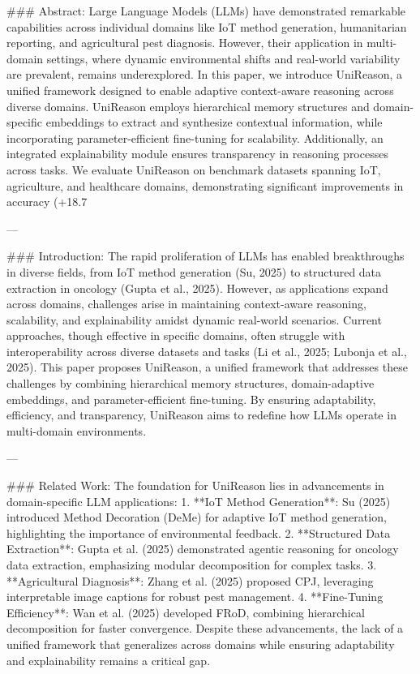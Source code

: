 ### Abstract:
Large Language Models (LLMs) have demonstrated remarkable capabilities across individual domains like IoT method generation, humanitarian reporting, and agricultural pest diagnosis. However, their application in multi-domain settings, where dynamic environmental shifts and real-world variability are prevalent, remains underexplored. In this paper, we introduce UniReason, a unified framework designed to enable adaptive context-aware reasoning across diverse domains. UniReason employs hierarchical memory structures and domain-specific embeddings to extract and synthesize contextual information, while incorporating parameter-efficient fine-tuning for scalability. Additionally, an integrated explainability module ensures transparency in reasoning processes across tasks. We evaluate UniReason on benchmark datasets spanning IoT, agriculture, and healthcare domains, demonstrating significant improvements in accuracy (+18.7%

---

### Introduction:
The rapid proliferation of LLMs has enabled breakthroughs in diverse fields, from IoT method generation (Su, 2025) to structured data extraction in oncology (Gupta et al., 2025). However, as applications expand across domains, challenges arise in maintaining context-aware reasoning, scalability, and explainability amidst dynamic real-world scenarios. Current approaches, though effective in specific domains, often struggle with interoperability across diverse datasets and tasks (Li et al., 2025; Lubonja et al., 2025). This paper proposes UniReason, a unified framework that addresses these challenges by combining hierarchical memory structures, domain-adaptive embeddings, and parameter-efficient fine-tuning. By ensuring adaptability, efficiency, and transparency, UniReason aims to redefine how LLMs operate in multi-domain environments.

---

### Related Work:
The foundation for UniReason lies in advancements in domain-specific LLM applications:
1. **IoT Method Generation**: Su (2025) introduced Method Decoration (DeMe) for adaptive IoT method generation, highlighting the importance of environmental feedback.
2. **Structured Data Extraction**: Gupta et al. (2025) demonstrated agentic reasoning for oncology data extraction, emphasizing modular decomposition for complex tasks.
3. **Agricultural Diagnosis**: Zhang et al. (2025) proposed CPJ, leveraging interpretable image captions for robust pest management.
4. **Fine-Tuning Efficiency**: Wan et al. (2025) developed FRoD, combining hierarchical decomposition for faster convergence.
Despite these advancements, the lack of a unified framework that generalizes across domains while ensuring adaptability and explainability remains a critical gap.

